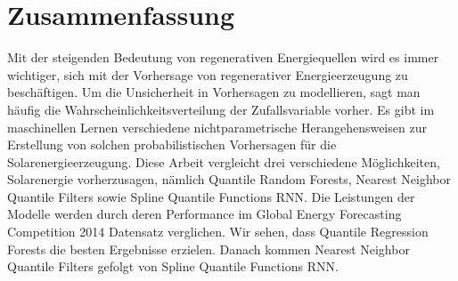 
\chapter*{Zusammenfassung}

\begin{center}
  \begin{minipage}{12cm}
    \begin{sloppypar}
      Mit der steigenden Bedeutung von regenerativen Energiequellen wird es immer wichtiger, 
      sich mit der Vorhersage von regenerativer Energieerzeugung zu beschäftigen. 
      Um die Unsicherheit in Vorhersagen zu modellieren, sagt man häufig die Wahrscheinlichkeitsverteilung der 
      Zufallsvariable vorher. Es gibt im maschinellen Lernen verschiedene nichtparametrische Herangehensweisen 
      zur Erstellung von solchen probabilistischen Vorhersagen für die Solarenergieerzeugung. 
      Diese Arbeit vergleicht drei verschiedene Möglichkeiten, Solarenergie 
      vorherzusagen, nämlich Quantile Random Forests, Nearest Neighbor Quantile Filters sowie Spline Quantile Functions RNN. 
      Die Leistungen der Modelle werden durch deren Performance im Global Energy Forecasting Competition 2014 Datensatz verglichen. 
      Wir sehen, dass Quantile Regression Forests die besten Ergebnisse erzielen. Danach kommen Nearest Neighbor Quantile Filters 
      gefolgt von Spline Quantile Functions RNN.
    \end{sloppypar}
  \end{minipage}
\end{center}